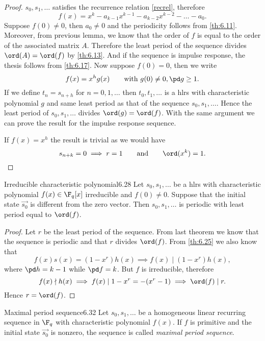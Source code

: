 \begin{proof}
	\(s_0,s_1,\ldots\) satisfies the recurrence relation \eqref{recrel}, therefore
	\[
		f(x) = x^k-a_{k-1}x^{k-1}-a_{k-2}x^{k-2}-\ldots-a_0.
	\]
	Suppose \(f(0)\neq 0\), then \(a_0\neq 0\) and the periodicity follows from \autoref{th:6.11}.
	Moreover, from previous lemma, we know that the order of \(f\) is equal to the order of the associated matrix \(A\). Therefore the least period of the sequence divides \(\ord(A)=\ord(f)\) by \autoref{th:6.13}. And if the sequence is impulse response, the thesis follows from \autoref{th:6.17}.
	Now suppose \(f(0)=0\), then we write
	\[
		f(x) = x^h g(x) \qquad\text{with }g(0)\neq 0, \pd g\ge 1.
	\]
	If we define \(t_n=s_{n+h}\) for \(n=0,1,\ldots\) then \(t_0,t_1,\ldots\) is a hlrs with characteristic polynomial \(g\) and same least period as that of the sequence \(s_0,s_1,\ldots\). Hence the least period of \(s_0,s_1,\ldots\) divides \(\ord(g)=\ord(f)\). With the same argument we can prove the result for the impulse response sequence.
	
	If \(f(x)=x^h\) the result is trivial as we would have
	\[
		s_{n+k}=0 \implies r=1 \qquad\text{and}\qquad\ord(x^k)=1.\qedhere
	\]
\end{proof}

\begin{teor}{Irreducible characteristic polynomial}{6.28}
	Let \(s_0,s_1,\ldots\) be a hlrs with characteristic polynomial \(f(x)\in\F_q[x]\) irreducible and \(f(0)\neq 0\). Suppose that the initial state \(\vec{s_0}\) is different from the zero vector. Then \(s_0,s_1,\ldots\) is periodic with least period equal to \(\ord(f)\).
\end{teor}

\begin{proof}
	Let \(r\) be the least period of the sequence.
	From last theorem we know that the sequence is periodic and that \(r\) divides \(\ord(f)\). From \autoref{th:6.25} we also know that
	\[
		f(x)s(x) = (1-x^r)h(x) \implies f(x) \mid (1-x^r)h(x),
	\]
	where \(\pd h=k-1\) while \(\pd f = k\). But \(f\) is irreducible, therefore
	\[
		f(x) \nmid h(x) \implies f(x) \mid 1-x^r = -(x^r-1) \implies \ord(f) \mid r.
	\]
	Hence \(r=\ord(f)\).
\end{proof}

\begin{defn}{Maximal period sequence}{6.32}
	Let \(s_0,s_1,\ldots\) be a homogeneous linear recurring sequence in \(\F_q\) with characteristic polynomial \(f(x)\). If \(f\) is primitive and the initial state \(\vec{s_0}\) is nonzero, the sequence is called \emph{maximal period sequence}.
\end{defn}

